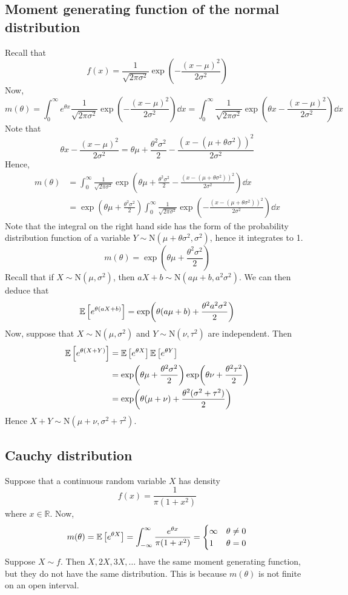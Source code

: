\subsection{Moment generating function of the normal distribution}
Recall that
\[
	f(x) = \frac{1}{\sqrt{2\pi \sigma^2}} \exp(-\frac{(x-\mu)^2}{2\sigma^2})
\]
Now,
\[
	m(\theta) = \int_0^\infty e^{\theta x} \frac{1}{\sqrt{2\pi \sigma^2}} \exp(-\frac{(x-\mu)^2}{2\sigma^2}) \dd{x} = \int_0^\infty \frac{1}{\sqrt{2\pi \sigma^2}} \exp(\theta x-\frac{(x-\mu)^2}{2\sigma^2}) \dd{x}
\]
Note that
\[
	\theta x - \frac{(x-\mu)^2}{2\sigma^2} = \theta \mu + \frac{\theta^2 \sigma^2}{2} - \frac{\left( x - (\mu + \theta\sigma^2) \right)^2}{2\sigma^2}
\]
Hence,
\begin{align*}
	m(\theta) & = \int_0^\infty \frac{1}{\sqrt{2\pi \sigma^2}} \exp(\theta \mu + \frac{\theta^2 \sigma^2}{2} - \frac{\left( x - (\mu + \theta\sigma^2) \right)^2}{2\sigma^2}) \dd{x}       \\
	          & = \exp(\theta \mu + \frac{\theta^2 \sigma^2}{2}) \int_0^\infty \frac{1}{\sqrt{2\pi \sigma^2}} \exp(- \frac{\left( x - (\mu + \theta\sigma^2) \right)^2}{2\sigma^2}) \dd{x}
\end{align*}
Note that the integral on the right hand side has the form of the probability distribution function of a variable \(Y \sim \mathrm{N}(\mu + \theta \sigma^2, \sigma^2)\), hence it integrates to 1.
\[
	m(\theta) = \exp(\theta \mu + \frac{\theta^2 \sigma^2}{2})
\]
Recall that if \(X \sim \mathrm{N}(\mu, \sigma^2)\), then \(aX + b \sim \mathrm{N}(a\mu + b, a^2\sigma^2)\).
We can then deduce that
\[
	\mathbb{E}\left[{e^{\theta(aX + b)}}\right] = \exp(\theta(a \mu + b) + \frac{\theta^2 a^2\sigma^2}{2})
\]
Now, suppose that \(X \sim \mathrm{N}(\mu, \sigma^2)\) and \(Y \sim \mathrm{N}(\nu, \tau^2)\) are independent.
Then
\begin{align*}
	\mathbb{E}\left[{e^{\theta(X + Y)}}\right] &= \mathbb{E}\left[{e^{\theta X}}\right] \mathbb{E}\left[{e^{\theta Y}}\right] \\
	&= \exp(\theta \mu + \frac{\theta^2 \sigma^2}{2}) \exp(\theta \nu + \frac{\theta^2 \tau^2}{2}) \\
	&= \exp(\theta(\mu + \nu) + \frac{\theta^2 (\sigma^2 + \tau^2)}{2})
\end{align*}
Hence \(X + Y \sim \mathrm{N}(\mu + \nu, \sigma^2 + \tau^2)\).

\subsection{Cauchy distribution}
Suppose that a continuous random variable \(X\) has density
\[
	f(x) = \frac{1}{\pi(1 + x^2)}
\]
where \(x \in \mathbb R\).
Now,
\[
	m(\theta) = \mathbb{E}\left[{e^{\theta X}}\right] = \int_{-\infty}^\infty \frac{e^{\theta x}}{\pi(1 + x^2)} = \begin{cases}
		\infty & \theta \neq 0 \\
		1      & \theta = 0
	\end{cases}
\]
Suppose \(X \sim f\).
Then \(X, 2X, 3X, \dots\) have the same moment generating function, but they do not have the same distribution.
This is because \(m(\theta)\) is not finite on an open interval.

